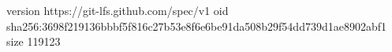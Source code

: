 version https://git-lfs.github.com/spec/v1
oid sha256:3698f219136bbbf5f816c27b53e8f6e6be91da508b29f54dd739d1ae8902abf1
size 119123

